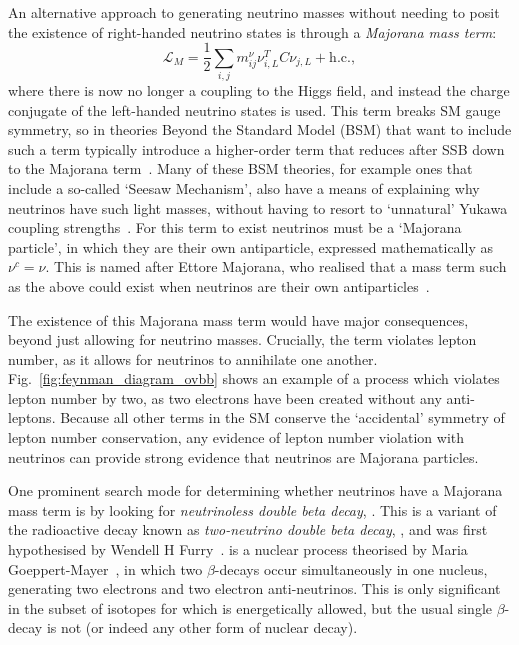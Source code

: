 An alternative approach to generating neutrino masses without needing to posit the existence of right-handed neutrino states is through a \textit{Majorana mass term}:
\begin{equation}
    \mathcal{L}_{M} = \frac{1}{2}\sum_{i,j}m^{\nu}_{ij}\nu^{T}_{i,L}C\nu_{j,L} + \mathrm{ h.c.},
\end{equation}
where there is now no longer a coupling to the Higgs field, and instead the charge conjugate of the left-handed neutrino states is used. This term breaks SM gauge symmetry, so in theories Beyond the Standard Model (BSM) that want to include such a term typically introduce a higher-order term that reduces after SSB down to the Majorana term~\cite{weinbergBaryonLeptonNonconservingProcesses1979}. %
Many of these BSM theories, for example ones that include a so-called `Seesaw Mechanism', also have a means of explaining why neutrinos have such light masses, without having to resort to `unnatural' Yukawa coupling strengths~\cite{minkowskiEgRateOne1977}. %
For this term to exist neutrinos must be a `Majorana particle', in which they are their own antiparticle, expressed mathematically as $\nu^{c} = \nu$. This is named after Ettore Majorana, who realised that a mass term such as the above could exist when neutrinos are their own antiparticles~\cite{majoranaTeoriaSimmetricaElettrone1937}. %

The existence of this Majorana mass term would have major consequences, beyond just allowing for neutrino masses. Crucially, the term violates lepton number, as it allows for neutrinos to annihilate one another. Fig.~\ref{fig:feynman_diagram_ovbb} shows an example of a process which violates lepton number by two, as two electrons have been created without any anti-leptons. Because all other terms in the SM conserve the `accidental' symmetry of lepton number conservation, any evidence of lepton number violation with neutrinos can provide strong evidence that neutrinos are Majorana particles.

One prominent search mode for determining whether neutrinos have a Majorana mass term is by looking for \textit{neutrinoless double beta decay}, \onbb{}. This is a variant of the radioactive decay known as \textit{two-neutrino double beta decay}, \twonbb{}, and was first hypothesised by Wendell H Furry~\cite{furryTransitionProbabilitiesDouble1939}. %
\twonbb{} is a nuclear process theorised by Maria Goeppert-Mayer~\cite{goeppert-mayerDoubleBetaDisintegration1935}, %
in which two $\beta$-decays occur simultaneously in one nucleus, generating two electrons and two electron anti-neutrinos. This is only significant in the subset of isotopes for which \twonbb{} is energetically allowed, but the usual single $\beta$-decay is not (or indeed any other form of nuclear decay).

